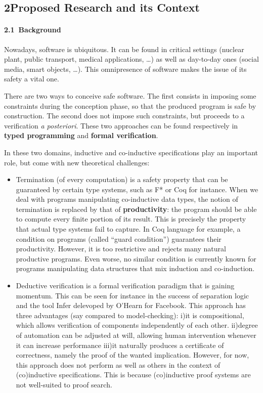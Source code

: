 \documentclass[11pt,twocolumn]{article}
\begin{document}
\newpage
\phantom{placeholder}\newpage

\subsection*{2\quad Proposed Research and its Context}

\paragraph{2.1\ Background}
Nowadays, software is ubiquitous. It can be found in critical settings (nuclear plant,
public transport, medical applications, \dots) as well as day-to-day ones (social media, smart objects, \dots).  This omnipresence of software makes the issue of its safety a vital one.

\smallskip
There are two ways to conceive safe software. The first consists in imposing some constraints
during the conception phase, so that the produced program is safe by construction. The second does not impose such constraints, but proceeds to a verification \textit{a posteriori}. These
two approaches can be found respectively in \textbf{typed programming} and \textbf{formal verification}.

\smallskip
In these two domains, inductive and co-inductive specifications play an important role, but come with new theoretical challenges:
\begin{itemize}
\item Termination (of every computation) is a safety property that can be guaranteed by
certain type systems, such as F* or Coq for instance.
When we deal with programs manipulating co-inductive data types, the notion of termination
is replaced by that of \textbf{productivity}: the program should be able to compute every finite portion of its result. This is precisely the property that actual type systems fail
to capture. In Coq language for example, a condition on programs (called ``guard condition'')
 guarantees their productivity. However, it is too restrictive and rejects many natural
productive programs. Even worse, no similar condition is currently known for programs manipulating data structures that mix induction and co-induction.

\item Deductive verification is a formal verification paradigm that is gaining momentum. This can be seen for instance in the success of separation logic and the tool Infer delevoped by O'Hearn for Facebook. This approach has three advantages (say compared to model-checking):
i)it is compositional, which allows verification of components independently of each other.
ii)degree of automation can be adjusted at will, allowing human intervention whenever it can increase performance
iii)it naturally produces a certificate of correctness, namely the proof of the wanted implication. However, for now, this approach does not perform as well as others in the context of (co)inductive specifications. This is because (co)inductive proof systems are not well-suited to proof search.


\end{itemize}
\end{document}

